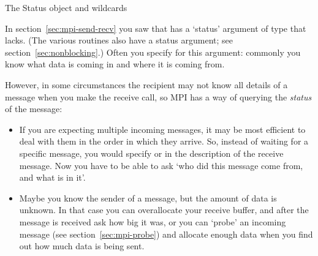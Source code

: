 




 {The Status object and wildcards}
\label{sec:mpi-wildcard}
\label{sec:mpi-status}

In section~\ref{sec:mpi-send-recv}
you saw that  has a `status' argument
of type  that  lacks.
(The various   routines also have a status
argument; see section~\ref{sec:nonblocking}.)
Often you specify 
for this argument: commonly you know
what data is coming in and where it is coming from.

However, in some circumstances the recipient may not know all details of a
message when you make the receive call, so MPI has a way of querying
the \emph{status} of the message:
\begin{itemize}
\item If you are expecting multiple incoming messages, it may be most
  efficient to deal with them in the order in which they arrive. So,
  instead of waiting for a specific message, you would specify
   or  in
  the description of the receive message. 
  Now you have to be able to ask `who did this message come from,
  and what is in it'.
\item Maybe you know the sender of a message, but the amount of data
  is unknown. In that case you can overallocate your receive buffer,
  and after the message is received ask how big it was, or you can
  `probe' an incoming message
  (see section~\ref{sec:mpi-probe})
  and allocate enough data when you find
  out how much data is being sent.
\end{itemize}

